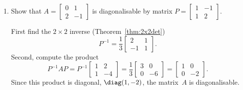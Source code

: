 \begin{example} \label{eg:diagonalise}
\begin{enumerate}
\item\label{eg:diagonalisea} 
Show that \(A=\begin{bmatrix} 0&1\\2&-1 \end{bmatrix}\) is diagonalisable by matrix \(P=\begin{bmatrix} 1&-1\\1&2 \end{bmatrix}\).
\begin{solution} 
First find the \(2\times2\) inverse (Theorem~\ref{thm:2x2det})
\begin{equation*}
P^{-1}=\frac1{3}\begin{bmatrix} 2&1\\-1&1 \end{bmatrix}.
\end{equation*}
Second, compute the product
\begin{equation*}
P^{-1}AP
=P^{-1}\begin{bmatrix} 1&2\\1&-4 \end{bmatrix}
=\frac13\begin{bmatrix} 3&0\\0&-6 \end{bmatrix}
=\begin{bmatrix} 1&0\\0&-2 \end{bmatrix}.
\end{equation*}
Since this product is diagonal, \(\diag(1,-2)\), the matrix~\(A\) is diagonalisable.
\end{solution}



\end{enumerate}
\end{example}
